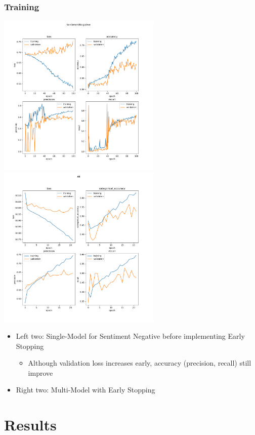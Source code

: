 \documentclass[compress,aspectratio=169]{beamer} %
\begin{document}
\begin{frame}[fragile]
	\frametitle{Training}
	\hspace*{-1cm}
	\includegraphics[trim={1.6cm 12.4cm 2cm 0.5cm},clip,width=7.8cm]{img/training_SentimentNegative_100}%
	\includegraphics[trim={1.4cm 12.4cm 2cm 0.5cm},clip,width=7.8cm]{img/training_All_22}
	\small
	\vspace{-5mm}
	\begin{itemize}
		\item Left two: Single-Model for Sentiment Negative before implementing Early Stopping
		\begin{itemize}
			\item Although validation loss increases early, accuracy (precision, recall) still improve
		\end{itemize}
		\item Right two: Multi-Model with Early Stopping
	\end{itemize}
\end{frame}

\section{Results}
\end{document}
